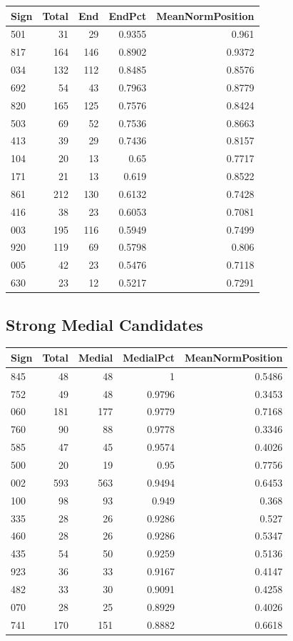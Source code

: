 ﻿\documentclass[11pt,a4paper]{article}
\begin{document}
\begin{center}
\begin{tabular}{lrrrr}
\toprule
\textbf{Sign} & \textbf{Total} & \textbf{End} & \textbf{EndPct} & \textbf{MeanNormPosition} \\
\midrule
501 & 31 & 29 & 0.9355 & 0.961 \\
817 & 164 & 146 & 0.8902 & 0.9372 \\
034 & 132 & 112 & 0.8485 & 0.8576 \\
692 & 54 & 43 & 0.7963 & 0.8779 \\
820 & 165 & 125 & 0.7576 & 0.8424 \\
503 & 69 & 52 & 0.7536 & 0.8663 \\
413 & 39 & 29 & 0.7436 & 0.8157 \\
104 & 20 & 13 & 0.65 & 0.7717 \\
171 & 21 & 13 & 0.619 & 0.8522 \\
861 & 212 & 130 & 0.6132 & 0.7428 \\
416 & 38 & 23 & 0.6053 & 0.7081 \\
003 & 195 & 116 & 0.5949 & 0.7499 \\
920 & 119 & 69 & 0.5798 & 0.806 \\
005 & 42 & 23 & 0.5476 & 0.7118 \\
630 & 23 & 12 & 0.5217 & 0.7291 \\
\bottomrule
\end{tabular}
\end{center}

\subsection*{Strong Medial Candidates}

\begin{center}
\begin{tabular}{lrrrr}
\toprule
\textbf{Sign} & \textbf{Total} & \textbf{Medial} & \textbf{MedialPct} & \textbf{MeanNormPosition} \\
\midrule
845 & 48 & 48 & 1 & 0.5486 \\
752 & 49 & 48 & 0.9796 & 0.3453 \\
060 & 181 & 177 & 0.9779 & 0.7168 \\
760 & 90 & 88 & 0.9778 & 0.3346 \\
585 & 47 & 45 & 0.9574 & 0.4026 \\
500 & 20 & 19 & 0.95 & 0.7756 \\
002 & 593 & 563 & 0.9494 & 0.6453 \\
100 & 98 & 93 & 0.949 & 0.368 \\
335 & 28 & 26 & 0.9286 & 0.527 \\
460 & 28 & 26 & 0.9286 & 0.5347 \\
435 & 54 & 50 & 0.9259 & 0.5136 \\
923 & 36 & 33 & 0.9167 & 0.4147 \\
482 & 33 & 30 & 0.9091 & 0.4258 \\
070 & 28 & 25 & 0.8929 & 0.4026 \\
741 & 170 & 151 & 0.8882 & 0.6618 \\
\bottomrule
\end{tabular}
\end{center}
\end{document}
